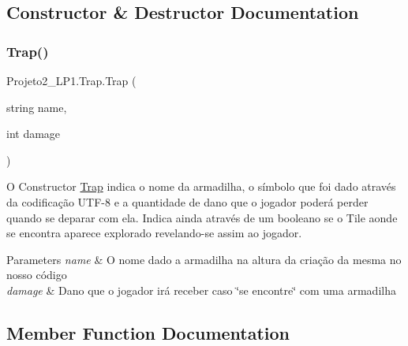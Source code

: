 \subsection{Constructor \& Destructor Documentation}
\mbox{\label{class_projeto2___l_p1_1_1_trap_a224953ea9e5f3050ecb5610c2609fe9d}} 
\subsubsection{\texorpdfstring{Trap()}{Trap()}}
{\footnotesize\ttfamily Projeto2\+\_\+\+L\+P1.\+Trap.\+Trap (\begin{DoxyParamCaption}\item[{string}]{name,  }\item[{int}]{damage }\end{DoxyParamCaption})\hspace{0.3cm}{\ttfamily [inline]}}



O Constructor \mbox{\hyperlink{class_projeto2___l_p1_1_1_trap}{Trap}} indica o nome da armadilha, o símbolo que foi dado através da codificação U\+T\+F-\/8 e a quantidade de dano que o jogador poderá perder quando se deparar com ela. Indica ainda através de um booleano se o Tile aonde se encontra aparece explorado revelando-\/se assim ao jogador. 


\begin{DoxyParams}{Parameters}
{\em name} & O nome dado a armadilha na altura da criação da mesma no nosso código\\
\hline
{\em damage} & Dano que o jogador irá receber caso \char`\"{}se encontre\char`\"{} com uma armadilha\\
\hline
\end{DoxyParams}


\subsection{Member Function Documentation}
\mbox{\label{class_projeto2___l_p1_1_1_trap_a1abb25aa0b1f0b59026e9985a14875bf}} 

